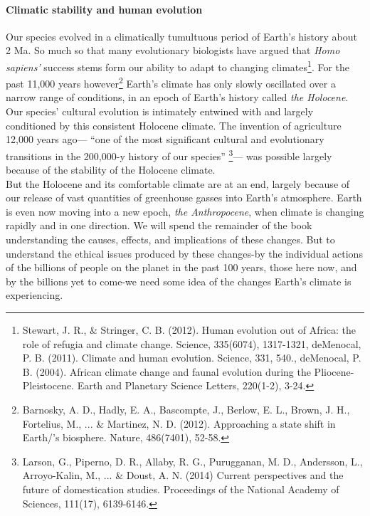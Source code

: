 \paragraph{Climatic stability and human evolution}
Our species evolved in a climatically tumultuous period of Earth's history about 2 Ma. So much so that many evolutionary biologists have argued that \textit{Homo sapiens'} success stems form our ability to adapt to changing climates\footnote{Stewart, J. R., \& Stringer, C. B. (2012). Human evolution out of Africa: the role of refugia and climate change. Science, 335(6074), 1317-1321, deMenocal, P. B. (2011). Climate and human evolution. Science, 331, 540., deMenocal, P. B. (2004). African climate change and faunal evolution during the Pliocene-Pleistocene. Earth and Planetary Science Letters, 220(1-2), 3-24.}. For the past 11,000 years however\footnote{Barnosky, A. D., Hadly, E. A., Bascompte, J., Berlow, E. L., Brown, J. H., Fortelius, M., ... \& Martinez, N. D. (2012). Approaching a state shift in Earth/'s biosphere. Nature, 486(7401), 52-58.} Earth's climate has only slowly oscillated over a narrow range of conditions, in an epoch of Earth's history called \emph{the Holocene}. Our species' cultural evolution is intimately entwined with and largely conditioned by this consistent Holocene climate. The invention of agriculture 12,000 years ago--- ``one of the most significant cultural and evolutionary transitions in the 200,000-y history of our species'' \footnote{Larson, G., Piperno, D. R., Allaby, R. G., Purugganan, M. D., Andersson, L., Arroyo-Kalin, M., ... \& Doust, A. N. (2014) Current perspectives and the future of domestication studies. Proceedings of the National Academy of Sciences, 111(17), 6139-6146.}--- was possible largely because of the stability of the Holocene climate.\\

But the Holocene and its comfortable climate are at an end, largely because of our release of vast quantities of greenhouse gasses into Earth's atmosphere. Earth is even now moving into a new epoch, \emph{the Anthropocene}, when climate is changing rapidly and in one direction. We will spend the remainder of the book understanding the causes, effects, and implications of these changes. But to understand the ethical issues produced by these changes-by the individual actions of the billions of people on the planet in the past 100 years, those here now, and by the billions yet to come-we need some idea of the changes Earth's climate is experiencing.

